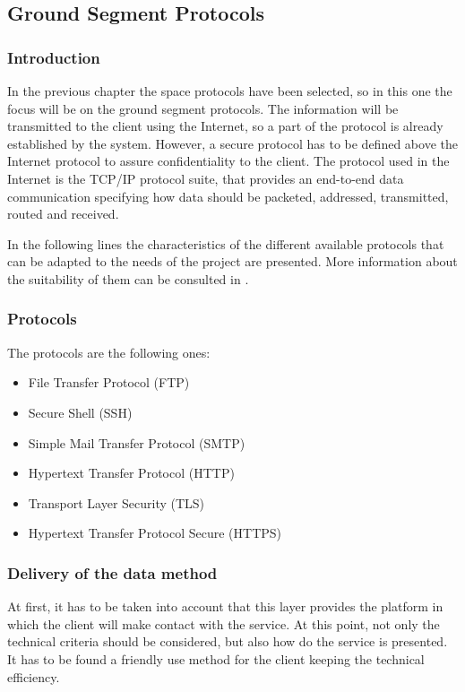 \subsection{Ground Segment Protocols}

\subsubsection{Introduction}
In the previous chapter the space protocols have been selected, so in this one the focus will be on the ground segment protocols. The information will be transmitted to the client using the Internet, so a part of the protocol is already established by the system. However, a secure protocol has to be defined above the Internet protocol to assure confidentiality to the client. The protocol used in the Internet is the TCP/IP protocol suite, that provides an end-to-end data communication specifying how data should be packeted, addressed, transmitted, routed and received.

In the following lines the characteristics of the different available protocols that can be adapted to the needs of the project are presented. More information about the suitability of them can be consulted in \cite[Chapter 2, Section 2]{annex3}.

\subsubsection{Protocols}
The protocols are the following ones:
\begin{itemize}
\item File Transfer Protocol (FTP)
\item Secure Shell (SSH)
\item Simple Mail Transfer Protocol (SMTP)
\item Hypertext Transfer Protocol (HTTP)
\item Transport Layer Security (TLS)
\item Hypertext Transfer Protocol Secure (HTTPS)
\end{itemize} 

\subsubsection{Delivery of the data method} 
At first, it has to be taken into account that this layer provides the platform in which the client will make contact with the service. At this point, not only the technical criteria should be considered, but also how do the service is presented. It has to be found a friendly use method for the client keeping the technical efficiency.

